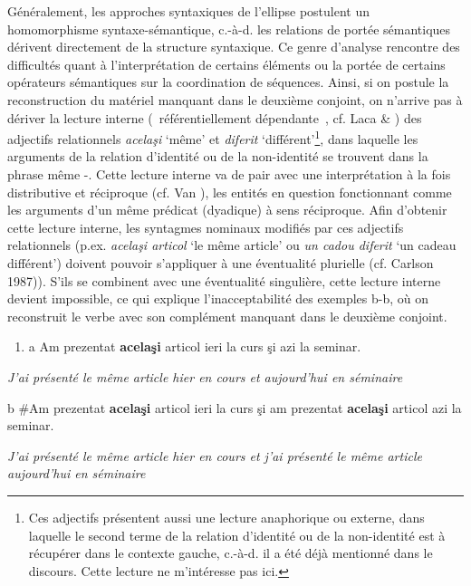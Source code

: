 Généralement, les approches syntaxiques de l'ellipse postulent un homomorphisme syntaxe-sémantique, c.-à-d. les relations de portée sémantiques dérivent directement de la structure syntaxique. Ce genre d'analyse rencontre des difficultés quant à l'interprétation de certains éléments ou la portée de certains opérateurs sémantiques sur la coordination de séquences. Ainsi, si on postule la reconstruction du matériel manquant dans le deuxième conjoint, on n'arrive pas à dériver la lecture interne ({\guillemotleft}~référentiellement dépendante~{\guillemotright}, cf. Laca \& \citet{Tasmowski2001}) des adjectifs relationnels \textit{acelaşi} `même' et \textit{diferit} `différent'\footnote{Ces adjectifs présentent aussi une lecture anaphorique ou externe, dans laquelle le second terme de la relation d'identité ou de la non-identité est à récupérer dans le contexte gauche, c.-à-d. il a été déjà mentionné dans le discours. Cette lecture ne m'intéresse pas ici.}, dans laquelle les arguments de la relation d'identité ou de la non-identité se trouvent dans la phrase même -. Cette lecture interne va de pair avec une interprétation à la fois distributive et réciproque (cf. Van \citet{Peteghem2002}), les entités en question fonctionnant comme les arguments d'un même prédicat (dyadique) à sens réciproque. Afin d'obtenir cette lecture interne, les syntagmes nominaux modifiés par ces adjectifs relationnels (p.ex. \textit{acelaşi articol} `le même article' ou \textit{un cadou diferit} `un cadeau différent') doivent pouvoir s'appliquer à une éventualité plurielle (cf. Carlson 1987)). S'ils se combinent avec une éventualité singulière, cette lecture interne devient impossible, ce qui explique l'inacceptabilité des exemples b-b, où on reconstruit le verbe avec son complément manquant dans le deuxième conjoint.


\begin{enumerate}
\item \label{bkm:Ref290305774}a  Am prezentat \textbf{acelaşi} articol ieri la curs şi azi la seminar.


\end{enumerate}
{\itshape
J'ai présenté le même article hier en cours et aujourd'hui en séminaire}

  b  \#Am prezentat \textbf{acelaşi} articol ieri la curs şi am prezentat \textbf{acelaşi} articol azi la seminar.

{\itshape
J'ai présenté le même article hier en cours et j'ai présenté le même article aujourd'hui en séminaire}



